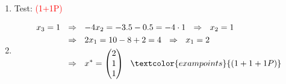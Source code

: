 {\begin{enumerate}
\begin{align*}
	\right)
	\textcolor{magenta}{\begin{matrix}(\text{I})\\ (\text{II})\\ (\text{III})\end{matrix}},  \begin{pmatrix}
	2\\
	1\\
	3
	\end{pmatrix}\\
	\stackrel{\textcolor{magenta}{(\text{III})'=(\text{III})-(\text{II})}}{\rightsquigarrow}
	&\left(
	\begin{array}{ccc|c} 2&8&-2&10\\\textcolor{red}{\frac{1}{4}}&-4&\frac{1}{2}&-3.5\\\textcolor{red}{\frac{1}{2}}&\textcolor{red}{1}&2.5&2.5\end{array}
	\right)
	\textcolor{magenta}{\begin{matrix}(\text{I})\\ (\text{II})\\ (\text{III})\end{matrix}},  \begin{pmatrix}
	2\\
	1\\
	3
	\end{pmatrix}
	\end{align*}
	We obtain $$
	P = \begin{pmatrix}0&1&0\\1&0&0\\0&0&1\end{pmatrix}~\textcolor{exampoints}{(1P)}~, ~~L=\begin{pmatrix}1&0&0\\\textcolor{red}{\frac{1}{4}}&1&0\\\textcolor{red}{\frac{1}{2}}&\textcolor{red}{1}&1\end{pmatrix}~\textcolor{exampoints}{(1P)}~,
	~~U = \begin{pmatrix}2&8&-2\\0&-4&\frac{1}{2}\\0&0&2.5\end{pmatrix}~\textcolor{exampoints}{(1P)}~$$
	\item Test: \textcolor{red}{(1+1P)}
	\item \begin{align*}
	x_3=1~~&\Rightarrow~~-4x_2=-3.5-0.5=-4\cdot 1~~\Rightarrow~~x_2=1\\
	&\Rightarrow~~2x_1=10-8+2=4~~\Rightarrow~~x_1=2\\
	&\Rightarrow~~x^*=\begin{pmatrix}2\\1\\1\end{pmatrix}~~\textcolor{exampoints}{(1+1+1P)}
	\end{align*}
\end{enumerate}



}